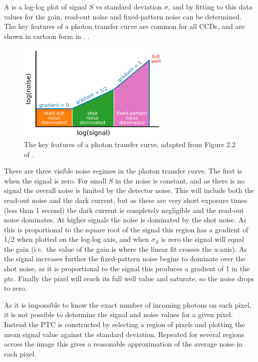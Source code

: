 \begin{colsection}
\begin{colsection}
A  is a log-log plot of signal $S$ vs standard deviation $\sigma$, and by fitting  to this data values for the gain, read-out noise and fixed-pattern noise can be determined. The key features of a photon transfer curve are common for all CCDs, and are shown in cartoon form in .
.
\newpage

\begin{figure}[t]
    \begin{center}
        \includegraphics[width=0.65\textwidth]{images/ptc.pdf}
    \end{center}
    \caption[Key features of the photon transfer curve]{
        The key features of a photon transfer curve, adapted from Figure 2.2 of \citet{CCDs}.
        }\label{fig:ptc_cartoon}
\end{figure}

There are three visible noise regimes in the photon transfer curve. The first is when the signal is zero. For small $S$ in  the noise is constant, and as there is no signal the overall noise is limited by the detector noise. This will include both the read-out noise and the dark current, but as these are very short exposure times (less than 1 second) the dark current is completely negligible and the read-out noise dominates. At higher signals the noise is dominated by the shot noise. As this is proportional to the square root of the signal this region has a gradient of 1/2 when plotted on the log-log axis, and when $\sigma_S$ is zero the signal will equal the gain (i.e.\ the value of the gain is where the linear fit crosses the x-axis). As the signal increases further the fixed-pattern noise begins to dominate over the shot noise, as it is proportional to the signal this produces a gradient of 1 in the \gls{ptc}. Finally the pixel will reach its full well value and saturate, so the noise drops to zero.

As it is impossible to know the exact number of incoming photons on each pixel, it is not possible to determine the signal and noise values for a given pixel. Instead the PTC is constructed by selecting a region of pixels and plotting the mean signal value against the standard deviation. Repeated for several regions across the image this gives a reasonable approximation of the average noise in each pixel.


\end{colsection}
\end{colsection}
